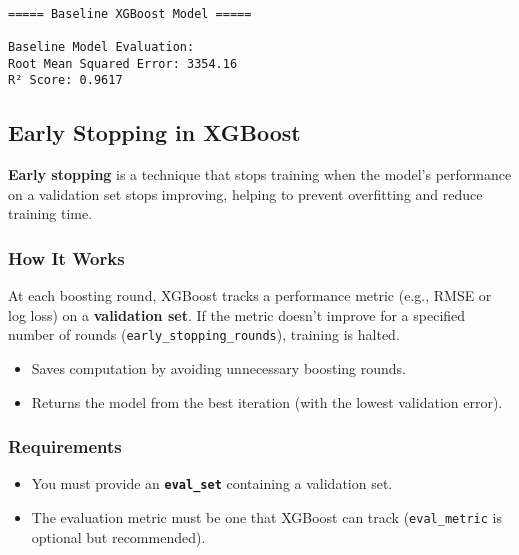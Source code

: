 \documentclass[
  letterpaper,
  DIV=11,
  numbers=noendperiod]{scrreprt}
\providecommand{\tightlist}{%
  \setlength{\itemsep}{0pt}\setlength{\parskip}{0pt}}\usepackage{longtable,booktabs,array}
\begin{document}
\begin{verbatim}

===== Baseline XGBoost Model =====

Baseline Model Evaluation:
Root Mean Squared Error: 3354.16
R² Score: 0.9617
\end{verbatim}

\subsection{Early Stopping in XGBoost}\label{early-stopping-in-xgboost}

\textbf{Early stopping} is a technique that stops training when the
model's performance on a validation set stops improving, helping to
prevent overfitting and reduce training time.

\subsubsection{How It Works}\label{how-it-works}

At each boosting round, XGBoost tracks a performance metric (e.g., RMSE
or log loss) on a \textbf{validation set}. If the metric doesn't improve
for a specified number of rounds (\texttt{early\_stopping\_rounds}),
training is halted.

\begin{itemize}
\tightlist
\item
  Saves computation by avoiding unnecessary boosting rounds.
\item
  Returns the model from the best iteration (with the lowest validation
  error).
\end{itemize}

\subsubsection{Requirements}\label{requirements}

\begin{itemize}
\tightlist
\item
  You must provide an \textbf{\texttt{eval\_set}} containing a
  validation set.
\item
  The evaluation metric must be one that XGBoost can track
  (\texttt{eval\_metric} is optional but recommended).
\end{itemize}
\end{document}
